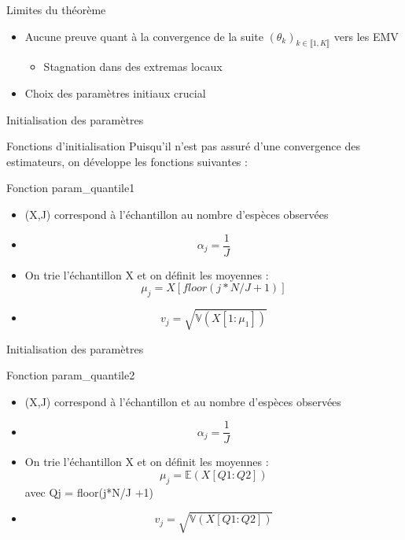 \documentclass[11pt]{beamer}
\begin{document}
	\begin{frame}{Limites du théorème}
		\begin{block}{}
			\begin{itemize}
				\item Aucune preuve quant à la convergence de la suite $(\theta_k)_{k \in \llbracket 1, K \rrbracket}$ vers les EMV
				\begin{itemize}
					\item Stagnation dans des extremas locaux
				\end{itemize}
				\item Choix des paramètres initiaux crucial
			\end{itemize}
		\end{block}	
	\end{frame}


	\begin{frame}{Initialisation des paramètres}
		\scriptsize
		\begin{block}{Fonctions d'initialisation}
			Puisqu'il n'est pas assuré d'une convergence des estimateurs, on développe les fonctions suivantes :
		\end{block}

		\begin{block}{Fonction param\_quantile1}
			\begin{itemize}
				\item (X,J) correspond à l'échantillon au nombre d'espèces observées
				\item \[
					\alpha_j = \frac{1}{J}
					\]
				\item On trie l'échantillon X et on définit les moyennes :
					\[
					\mu_j =  X [floor(j*N/J +1)]
					\]
				\item \[
					v_j = \sqrt{\mathbb{V}( X [1: \mu_1])}
					\]
			\end{itemize}
		\end{block}
	\end{frame}

	\begin{frame}{Initialisation des paramètres}
	\scriptsize
		\begin{block}{Fonction param\_quantile2}
			\begin{itemize}
				\item (X,J) correspond à l'échantillon et au nombre d'espèces observées
				\item \[
					\alpha_j = \frac{1}{J}
					\]
				\item On trie l'échantillon X et on définit les moyennes :
					\[
					\mu_j =  \mathbb{E}( X [Q1: Q2])
					\] avec Qj = floor(j*N/J +1)
				\item \[
					v_j = \sqrt{\mathbb{V}( X [Q1: Q2])}
					\]
			\end{itemize}
		\end{block}
	\end{frame}
\end{document}
